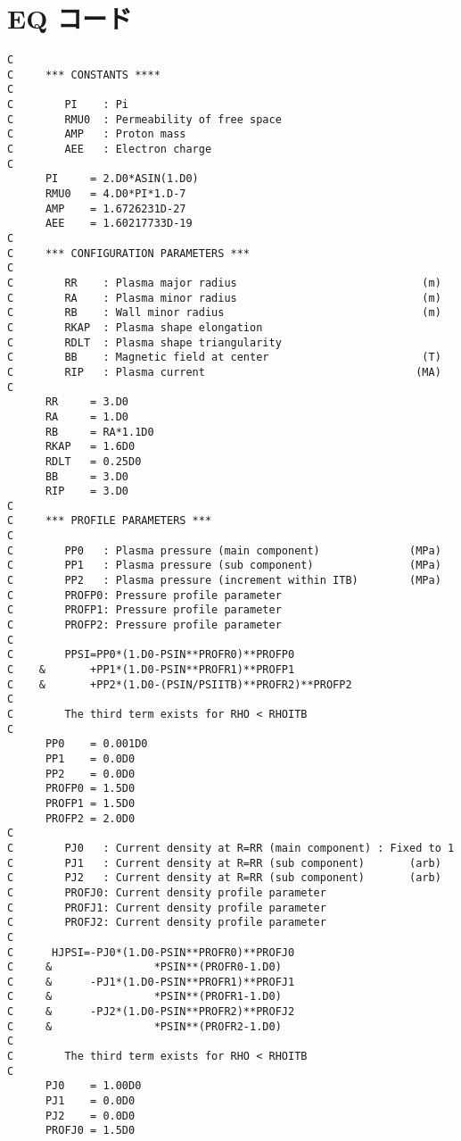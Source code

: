 \documentclass[11pt]{jarticle}
\begin{document}
\section{EQ コード}
\begin{verbatim}
C
C     *** CONSTANTS ****
C
C        PI    : Pi
C        RMU0  : Permeability of free space
C        AMP   : Proton mass
C        AEE   : Electron charge
C
      PI     = 2.D0*ASIN(1.D0)
      RMU0   = 4.D0*PI*1.D-7
      AMP    = 1.6726231D-27
      AEE    = 1.60217733D-19
C
C     *** CONFIGURATION PARAMETERS ***
C
C        RR    : Plasma major radius                             (m)
C        RA    : Plasma minor radius                             (m)
C        RB    : Wall minor radius                               (m)
C        RKAP  : Plasma shape elongation
C        RDLT  : Plasma shape triangularity 
C        BB    : Magnetic field at center                        (T)
C        RIP   : Plasma current                                 (MA)
C
      RR     = 3.D0
      RA     = 1.D0
      RB     = RA*1.1D0
      RKAP   = 1.6D0
      RDLT   = 0.25D0
      BB     = 3.D0
      RIP    = 3.D0
C
C     *** PROFILE PARAMETERS ***
C
C        PP0   : Plasma pressure (main component)              (MPa)
C        PP1   : Plasma pressure (sub component)               (MPa)
C        PP2   : Plasma pressure (increment within ITB)        (MPa)
C        PROFP0: Pressure profile parameter
C        PROFP1: Pressure profile parameter
C        PROFP2: Pressure profile parameter
C
C        PPSI=PP0*(1.D0-PSIN**PROFR0)**PROFP0
C    &       +PP1*(1.D0-PSIN**PROFR1)**PROFP1
C    &       +PP2*(1.D0-(PSIN/PSIITB)**PROFR2)**PROFP2
C
C        The third term exists for RHO < RHOITB
C
      PP0    = 0.001D0
      PP1    = 0.0D0
      PP2    = 0.0D0
      PROFP0 = 1.5D0
      PROFP1 = 1.5D0
      PROFP2 = 2.0D0
C
C        PJ0   : Current density at R=RR (main component) : Fixed to 1
C        PJ1   : Current density at R=RR (sub component)       (arb)
C        PJ2   : Current density at R=RR (sub component)       (arb)
C        PROFJ0: Current density profile parameter
C        PROFJ1: Current density profile parameter
C        PROFJ2: Current density profile parameter
C
C      HJPSI=-PJ0*(1.D0-PSIN**PROFR0)**PROFJ0
C     &                *PSIN**(PROFR0-1.D0)
C     &      -PJ1*(1.D0-PSIN**PROFR1)**PROFJ1
C     &                *PSIN**(PROFR1-1.D0)
C     &      -PJ2*(1.D0-PSIN**PROFR2)**PROFJ2
C     &                *PSIN**(PROFR2-1.D0)
C
C        The third term exists for RHO < RHOITB
C
      PJ0    = 1.00D0
      PJ1    = 0.0D0
      PJ2    = 0.0D0
      PROFJ0 = 1.5D0

\end{verbatim}
\end{document}
